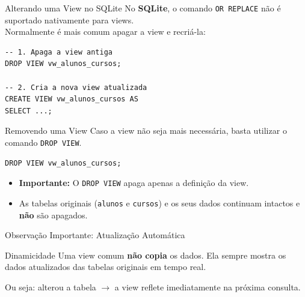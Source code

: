 \documentclass[9pt]{beamer}
\begin{document}
\begin{frame}[fragile]{Alterando uma View no SQLite}
    No \textbf{SQLite}, o comando \texttt{OR REPLACE} não é suportado nativamente para views.\\
    Normalmente é mais comum apagar a view e recriá-la:
    
    \vspace{0.3cm}
    \begin{lstlisting}
-- 1. Apaga a view antiga
DROP VIEW vw_alunos_cursos;

-- 2. Cria a nova view atualizada
CREATE VIEW vw_alunos_cursos AS
SELECT ...;
    \end{lstlisting}
\end{frame}

\begin{frame}[fragile]{Removendo uma View}
    Caso a view não seja mais necessária, basta utilizar o comando \texttt{DROP VIEW}.
    
    \begin{lstlisting}
DROP VIEW vw_alunos_cursos;
    \end{lstlisting}
    
    \begin{itemize}
        \item \textbf{Importante:} O \texttt{DROP VIEW} apaga apenas a definição da view.
        \item As tabelas originais (\texttt{alunos} e \texttt{cursos}) e os seus dados continuam intactos e \textbf{não} são apagados.
    \end{itemize}
\end{frame}

\begin{frame}{Observação Importante: Atualização Automática}
    \begin{block}{Dinamicidade}
        Uma view comum \textbf{não copia} os dados. Ela sempre mostra os dados atualizados das tabelas originais em tempo real.
    \end{block}
    
    \begin{center}
    \end{center}
    
    \vspace{0.3cm}
    Ou seja: alterou a tabela $\rightarrow$ a view reflete imediatamente na próxima consulta.
\end{frame}
\end{document}
